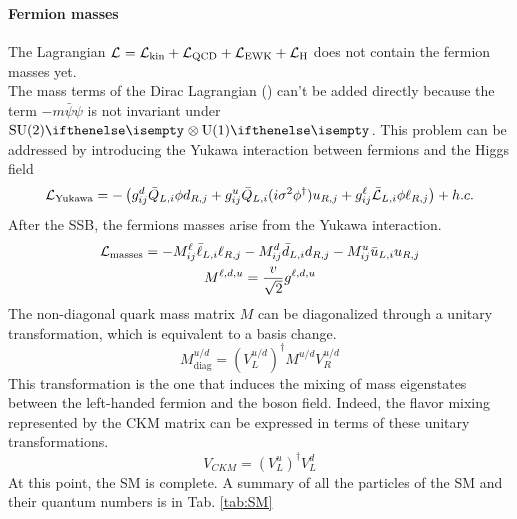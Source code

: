 \paragraph*{Fermion masses}
The Lagrangian $\mathcal{L}_\text{}=\mathcal{L}_\text{kin}+\mathcal{L}_\text{QCD}+\mathcal{L}_\text{EWK}+\mathcal{L}_\text{H}$ does not contain the fermion masses yet.\\
The mass terms of the Dirac Lagrangian () can't be added directly because the term \(-m \bar{\psi} \psi\) is not invariant under $\SU{2}\otimes \U{1}$.
This problem can be addressed by introducing the Yukawa interaction between fermions and the Higgs field
\begin{equation}
    \mathcal{L}_\text{Yukawa}=-\left(g_{i j}^{d}\bar{Q}_{L,i}\phi d_{R,j}+g_{i j}^{u}\bar{Q}_{L,i}(i\sigma^{2}\phi^{\dagger})u_{R,j}+g_{i j}^{\ell}\bar{\mathcal{L}}_{L,i}\phi\ell_{R,j}\right)+h.c.
\end{equation}
After the SSB, the fermions masses arise from the Yukawa interaction.
\begin{gather}
    \mathcal{L}_\text{masses}=-M_{i j}^{\ell}\bar{\ell}_{L,i}\ell_{R,j}-M_{i j}^{d}\bar{d}_{L,i}d_{R,j}-M_{i j}^{u}\bar{u}_{L,i}u_{R,j}\\
    M^{\ell,d,u}=\frac{v}{\sqrt{2}}g^{\ell,d,u}
\end{gather}
The non-diagonal quark mass matrix $M$ can be diagonalized through a unitary transformation, which is equivalent to a basis change.
\begin{equation}
    M_{\text{diag}}^{u/d}=(V_L^{u/d})^\dagger M^{u/d} V_R^{u/d}
\end{equation}
This transformation is the one that induces the mixing of mass eigenstates between the left-handed fermion and the \PW boson field.
Indeed, the flavor mixing represented by the CKM matrix can be expressed in terms of these unitary transformations.
\begin{equation}
    V_{CKM}=(V_L^u)^\dagger V_L^d
\end{equation}
At this point, the SM is complete. A summary of all the particles of the SM and their quantum numbers is in Tab. \ref{tab:SM}
\\
\\


